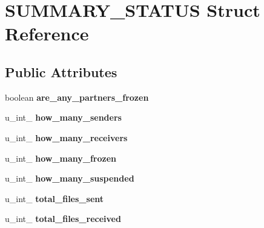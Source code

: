 \hypertarget{struct_s_u_m_m_a_r_y___s_t_a_t_u_s}{}\section{S\+U\+M\+M\+A\+R\+Y\+\_\+\+S\+T\+A\+T\+US Struct Reference}
\label{struct_s_u_m_m_a_r_y___s_t_a_t_u_s}
\subsection*{Public Attributes}
\begin{DoxyCompactItemize}
\item 
boolean {\bfseries are\+\_\+any\+\_\+partners\+\_\+frozen}\hypertarget{struct_s_u_m_m_a_r_y___s_t_a_t_u_s_a18085c6414908340db69ab3ff8195368}{}\label{struct_s_u_m_m_a_r_y___s_t_a_t_u_s_a18085c6414908340db69ab3ff8195368}

\item 
u\+\_\+int\+\_ {\bfseries how\+\_\+many\+\_\+senders}\hypertarget{struct_s_u_m_m_a_r_y___s_t_a_t_u_s_ae7cabc40d3be42891d607709d6054149}{}\label{struct_s_u_m_m_a_r_y___s_t_a_t_u_s_ae7cabc40d3be42891d607709d6054149}

\item 
u\+\_\+int\+\_ {\bfseries how\+\_\+many\+\_\+receivers}\hypertarget{struct_s_u_m_m_a_r_y___s_t_a_t_u_s_afd43ca09b186e9e97de9eafa8dc98475}{}\label{struct_s_u_m_m_a_r_y___s_t_a_t_u_s_afd43ca09b186e9e97de9eafa8dc98475}

\item 
u\+\_\+int\+\_ {\bfseries how\+\_\+many\+\_\+frozen}\hypertarget{struct_s_u_m_m_a_r_y___s_t_a_t_u_s_aefe5ac95f9c8521e2b4c3b2e8e936583}{}\label{struct_s_u_m_m_a_r_y___s_t_a_t_u_s_aefe5ac95f9c8521e2b4c3b2e8e936583}

\item 
u\+\_\+int\+\_ {\bfseries how\+\_\+many\+\_\+suspended}\hypertarget{struct_s_u_m_m_a_r_y___s_t_a_t_u_s_af4187f28e42d6141d09a7390c4226c4a}{}\label{struct_s_u_m_m_a_r_y___s_t_a_t_u_s_af4187f28e42d6141d09a7390c4226c4a}

\item 
u\+\_\+int\+\_ {\bfseries total\+\_\+files\+\_\+sent}\hypertarget{struct_s_u_m_m_a_r_y___s_t_a_t_u_s_a2550f0297898628aedbc901971cba87f}{}\label{struct_s_u_m_m_a_r_y___s_t_a_t_u_s_a2550f0297898628aedbc901971cba87f}

\item 
u\+\_\+int\+\_ {\bfseries total\+\_\+files\+\_\+received}\hypertarget{struct_s_u_m_m_a_r_y___s_t_a_t_u_s_a07c3ccbd94cacb04e80bcdd37a4f4f5f}{}\label{struct_s_u_m_m_a_r_y___s_t_a_t_u_s_a07c3ccbd94cacb04e80bcdd37a4f4f5f}


\end{DoxyCompactItemize}

